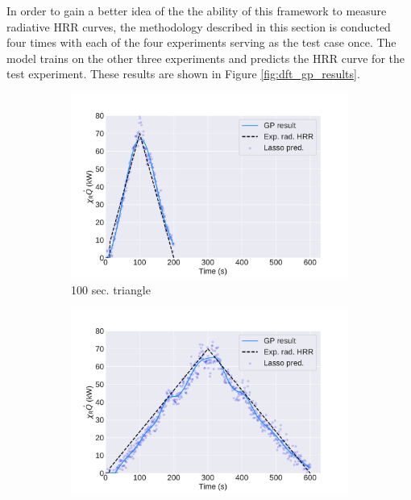 \documentclass{article}
\begin{document}
In order to gain a better idea of the the ability of this framework to measure radiative HRR curves, the methodology described in this section is conducted four times with each of the four experiments serving as the test case once. The model trains on the other three experiments and predicts the HRR curve for the test experiment. These results are shown in Figure \ref{fig:dft_gp_results}.

\begin{figure}[htbp]
  \centering
  \begin{subfigure}[t]{.45\textwidth}
      \centering
      \includegraphics[width=\textwidth,keepaspectratio]{figures/dft_result_100s_triangle.pdf}
      \caption{100 sec. triangle}
      \label{fig:dft_result_100s_triangle}
  \end{subfigure}
  \begin{subfigure}[t]{.45\textwidth}
      \centering
      \includegraphics[width=\textwidth ,keepaspectratio]{figures/dft_result_300s_triangle.pdf}

\end{subfigure}
\end{figure}
\end{document}
